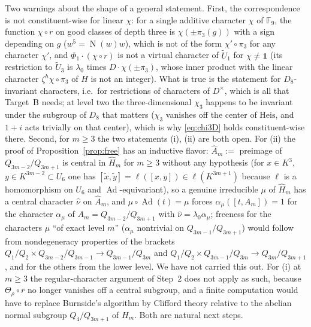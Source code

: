 \documentclass[11pt]{article}
\newcommand{\Fq}{\mathbb F}
\newcommand{\Nm}{\operatorname N}
\newcommand{\Ad}{\operatorname{Ad}}
\newcommand{\tU}{\widetilde U}
\theoremstyle{plain}
\theoremstyle{definition}
\begin{document}
Two warnings about the shape of a general statement.  First, the
correspondence is not constituent-wise for linear $\chi$: for a single
additive character $\chi$ of $\Fq_9$, the function $\chi\circ r$ on good
classes of depth three is $\chi(\pm\pi_3(g))$ with a sign depending on
$g$ ($w^5=\Nm(w)w$), which is not of the form $\chi'\circ\pi_3$ for any
character $\chi'$, and $\Phi_1\cdot(\chi\circ r)$ is not a virtual
character of $\tU_1$ for $\chi\ne\mathbf1$ (its restriction to $\tU_3$
is $\lambda_0$ times $D\cdot\chi(\pm\pi_3)$, whose inner product with the
linear character $\zeta^{h}\chi\circ\pi_3$ of $H$ is not an integer).
What is true is the statement for $D_8$-invariant characters, i.e.\ for
restrictions of characters of $D^\times$, which is all that Target~B
needs; at level two the three-dimensional $\chi_3$ happens to be
invariant under the subgroup of $D_8$ that matters ($\chi_3$ vanishes
off the center of $\mathrm{Heis}$, and $1+i$ acts trivially on that
center), which is why \eqref{eq:chi3D} holds constituent-wise there.
Second, for $m\ge3$ the two statements (i), (ii) are both open.  For
(ii) the proof of Proposition~\ref{prop:free} has an inductive flavor:
$\hat A_m:=$ preimage of $Q_{3m-2}/Q_{3m+1}$ is central in $\hat H_m$ for
$m\ge3$ without any hypothesis (for $x\in K^3$, $y\in K^{3m-2}\subset U_6$
one has $[\tilde x,\tilde y]=\ell([x,y])\in\ell(K^{3m+1})$ because $\ell$
is a homomorphism on $U_6$ and $\Ad$-equivariant), so a genuine
irreducible $\mu$ of $\hat H_m$ has a central character $\hat\nu$ on
$\hat A_m$, and $\mu\circ\Ad(t)=\mu$ forces $\alpha_\mu([t,A_m])=1$ for
the character $\alpha_\mu$ of $A_m=Q_{3m-2}/Q_{3m+1}$ with
$\hat\nu=\lambda_0\alpha_\mu$; freeness for the characters $\mu$ ``of
exact level $m$'' ($\alpha_\mu$ nontrivial on $Q_{3m-1}/Q_{3m+1}$) would
follow from nondegeneracy properties of the brackets
$Q_1/Q_2\times Q_{3m-2}/Q_{3m-1}\to Q_{3m-1}/Q_{3m}$ and
$Q_1/Q_2\times Q_{3m-1}/Q_{3m}\to Q_{3m}/Q_{3m+1}$, and for the others
from the lower level.  We have not carried this out.  For (i) at
$m\ge3$ the regular-character argument of Step~2 does not apply as
such, because $\Theta_\rho\circ r$ no longer vanishes off a central
subgroup, and a finite computation would have to replace Burnside's
algorithm by Clifford theory relative to the abelian normal subgroup
$Q_4/Q_{3m+1}$ of $H_m$.  Both are natural next steps.
\end{document}
